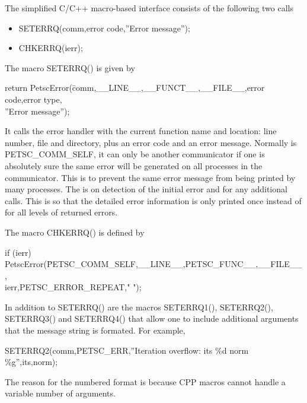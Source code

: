 \documentclass[twoside,12pt]{../sty/report_petsc}
\begin{document}
The simplified C/C++ macro-based interface consists of the following two calls
\begin{itemize}
\item SETERRQ(comm,error code,''Error message'');
\item CHKERRQ(ierr);
\end{itemize}

The macro SETERRQ() is given by
\begin{tabbing}
return PetscError(\=comm,\_\_LINE\_\_,\_\_FUNCT\_\_,\_\_FILE\_\_,error code,error type,\\
\> ''Error message'');
\end{tabbing}
It calls the error handler with the current function name and location: line number,
file and directory, plus an error code and an error message. Normally  is PETSC\_COMM\_SELF, it can only be another communicator if
one is absolutely sure the same error will be generated on all processes in the communicator. This is to prevent the same error message from
being printed by many processes. The  is  on detection of the initial error and  for any additional calls. This is so that
the detailed error information is only printed once instead of for all levels of returned errors.

The macro CHKERRQ() is defined by
\begin{tabbing}
  if (ierr)  PetscError(\=PETSC\_COMM\_SELF,\_\_LINE\_\_,PETSC\_FUNC\_\_,\_\_FILE\_\_, \\
 \>ierr,PETSC\_ERROR\_REPEAT," ");
\end{tabbing}

In addition to SETERRQ() are the macros SETERRQ1(), SETERRQ2(), SETERRQ3()
and SETERRQ4() that allow one to include additional arguments that the message
string is formated. For example,
\begin{tabbing}
  SETERRQ2(comm,PETSC\_ERR,''Iteration overflow: its \%d norm \%g'',its,norm);
\end{tabbing}
The reason for the numbered format is because CPP macros cannot handle a variable number
of arguments.
\end{document}
